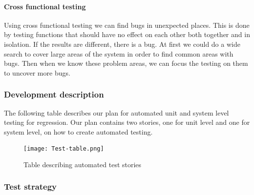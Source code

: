 \documentclass{article}
\begin{document}
\paragraph{Cross functional testing}
Using cross functional testing we can find bugs in unexpected places. This is done by testing functions that should have no effect on each other both together and in isolation. If the results are different, there is a bug. At first we could do a wide search to cover large areas of the system in order to find common areas with bugs. Then when we know these problem areas, we can focus the testing on them to uncover more bugs. 

\newpage
\subsubsection{Development description}

The following table describes our plan for automated unit and system level testing for regression. Our plan contains two stories, one for unit level and one for system level, on how to create automated testing.

\begin{figure}[H]
    \begin{center}
        \texttt{[image: Test-table.png]}
        \caption{Table describing automated test stories}
        \label{package}
    \end{center}
\end{figure}

\subsubsection{Test strategy}
\end{document}
